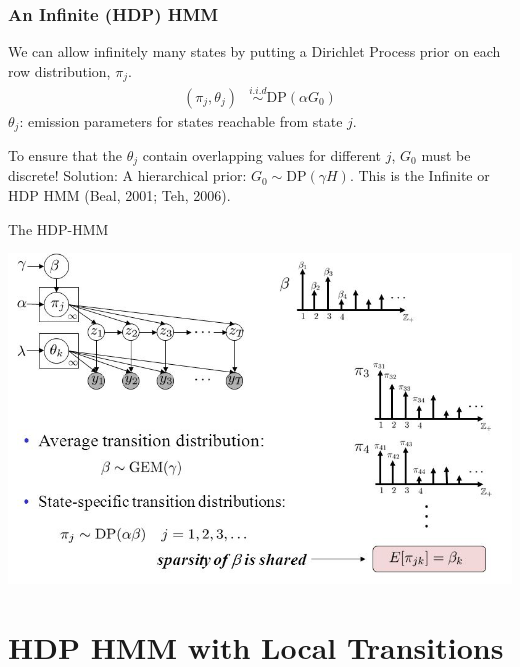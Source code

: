 \documentclass[11pt, mathserif, handout, table]{beamer}
\begin{document}
\begin{frame}

  \frametitle{An Infinite (HDP) HMM}
  We can allow infinitely many states by putting a Dirichlet Process
  prior on each row distribution, $\pi_j$.
  \begin{align}
    \label{eq:5}
    (\pi_j, \theta_j) &\stackrel{i.i.d}{\sim} \mathrm{DP}(\alpha G_0)
  \end{align}
  $\theta_j$: emission parameters for states
  reachable from state $j$.
  \pause

  \vspace{0.2in}

  To ensure that the $\theta_j$ contain overlapping values for 
  different $j$, $G_0$ must be discrete!
\pause
  \vspace{0.2in}
  Solution: A hierarchical prior: $G_0 \sim \mathrm{DP}(\gamma H)$.  
  This is the Infinite or HDP HMM (Beal, 2001; Teh, 2006).
\end{frame}

\begin{frame}{The HDP-HMM}
  \begin{center}
    \includegraphics[width=\textwidth]{img/hdp_hmm.png}
  \end{center}
\end{frame}

\section{HDP HMM with Local Transitions}
\label{sec:hdp-hidden-markov}

\end{document}
